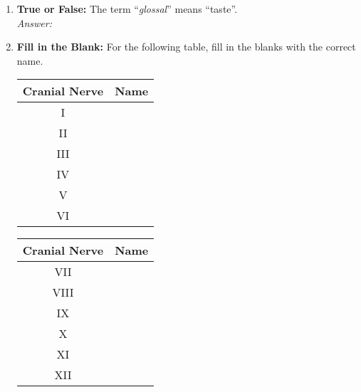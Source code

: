 \begin{enumerate}[label=\textbf{Q1.7.\arabic*}]
      \item \textbf{True or False:} The term ``\textit{glossal}'' means ``taste''. \\
            \textit{Answer:} %

      \item \textbf{Fill in the Blank:} For the following table, fill in the blanks with the correct name.

            \begin{multicols}{2}
                  \begin{tabular}{cc}
                        \toprule
                        \textbf{Cranial Nerve} & \textbf{Name}            \\ \midrule
                        I                      & \underline{\hspace{3cm}} \\[0.5em]
                        II                     & \underline{\hspace{3cm}} \\[0.5em]
                        III                    & \underline{\hspace{3cm}} \\[0.5em]
                        IV                     & \underline{\hspace{3cm}} \\[0.5em]
                        V                      & \underline{\hspace{3cm}} \\[0.5em]
                        VI                     & \underline{\hspace{3cm}} \\[0.5em]
                        \bottomrule
                  \end{tabular}
                  \begin{tabular}{cc}
                        \toprule
                        \textbf{Cranial Nerve} & \textbf{Name}            \\ \midrule
                        VII                    & \underline{\hspace{3cm}} \\[0.5em]
                        VIII                   & \underline{\hspace{3cm}} \\[0.5em]
                        IX                     & \underline{\hspace{3cm}} \\[0.5em]
                        X                      & \underline{\hspace{3cm}} \\[0.5em]
                        XI                     & \underline{\hspace{3cm}} \\[0.5em]
                        XII                    & \underline{\hspace{3cm}} \\[0.5em]
                        \bottomrule
                  \end{tabular}
            \end{multicols}


\end{enumerate}
